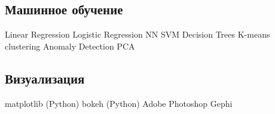 \documentclass[a4paper]{resume}
\begin{document}
\begin{minipage}[t]{0.33\textwidth}
\subsection{Машинное обучение}
Linear Regression\textbullet{} Logistic Regression\textbullet{} NN\textbullet{} SVM\textbullet{} Decision Trees
K-means clustering \textbullet{} Anomaly Detection \textbullet{} PCA
\sectionspace %



\subsection{Визуализация}
matplotlib (Python) \textbullet{} bokeh (Python) \textbullet{} Adobe Photoshop \textbullet{} Gephi
\sectionspace



\end{minipage} %
\hfill
%
%
\end{document}
